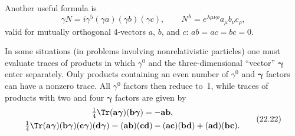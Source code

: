Another useful formula is
\begin{equation}
\gamma N = i\gamma^5(\gamma a)(\gamma b)(\gamma c),\qquad N^\lambda = e^{\lambda\mu\nu\rho}a_\mu b_\nu c_\rho,
\tag{22.21}
\end{equation}
valid for mutually orthogonal 4-vectors $a$, $b$, and $c$: $ab = ac = bc = 0$.

In some situations (in problems involving nonrelativistic particles) one must evaluate traces of products in which $\gamma^0$ and the three-dimensional ``vector'' $\boldsymbol{\gamma}$ enter separately. Only products containing an even number of $\gamma^0$ and $\boldsymbol{\gamma}$ factors can have a nonzero trace. All $\gamma^0$ factors then reduce to~1, while traces of products with two and four $\boldsymbol{\gamma}$ factors are given by
\begin{equation}
\begin{gathered}
\tfrac{1}{4}\Tr(\mathbf{a}\boldsymbol{\gamma})(\mathbf{b}\boldsymbol{\gamma}) = -\mathbf{ab},\\
\tfrac{1}{4}\Tr(\mathbf{a}\boldsymbol{\gamma})(\mathbf{b}\boldsymbol{\gamma})(\mathbf{c}\boldsymbol{\gamma})(\mathbf{d}\boldsymbol{\gamma}) = (\mathbf{ab})(\mathbf{cd}) - (\mathbf{ac})(\mathbf{bd}) + (\mathbf{ad})(\mathbf{bc}).
\end{gathered}
\tag{22.22}
\end{equation}
